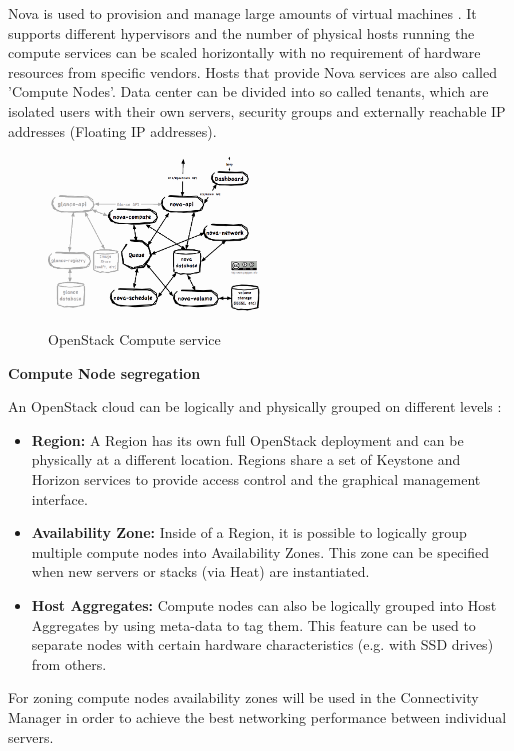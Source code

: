 Nova is used to provision and manage large amounts of virtual machines . It supports different hypervisors and the number of physical hosts running the compute services can be scaled horizontally with no requirement of hardware resources from specific vendors. Hosts that provide Nova services are also called 'Compute Nodes'. Data center can be divided into so called tenants, which are isolated users with their own servers, security groups and externally reachable IP addresses (Floating IP addresses). 

\begin{figure}[H]
\centering
\includegraphics[width=0.5\textwidth]{images/fundamentals/openstack_nova.png}
\caption{OpenStack Compute service} \cite{nova-arch}
\end{figure}

\textbf{Compute Node segregation}

An OpenStack cloud can be logically and physically grouped on different levels \cite{openstack-ops}:
\begin{itemize}
\item \textbf{Region:} A Region has its own full OpenStack deployment and can be physically at a different location. Regions share a set of Keystone and Horizon services to provide access control and the graphical management interface.
\item \textbf{Availability Zone:} Inside of a Region, it is possible to logically group multiple compute nodes into Availability Zones. This zone can be specified when new servers or stacks (via Heat) are instantiated.
\item \textbf{Host Aggregates:} Compute nodes can also be logically grouped into Host Aggregates by using meta-data to tag them. This feature can be used to separate nodes with certain hardware characteristics (e.g. with SSD drives) from others.
\end{itemize}

For zoning compute nodes availability zones will be used in the Connectivity Manager in order to achieve the best networking performance between individual servers.

